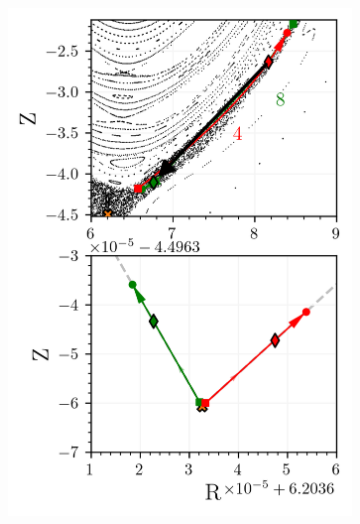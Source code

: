 \begin{figure}[h!]
    \centering
    \begin{subfigure}[c]{0.41\textwidth}
        \centering
        \includegraphics[width=\textwidth]{images/clinicsearch/clinic_start.png}
        \caption{}
        \label{fig:clinic-search-a}
    \end{subfigure}
    \hfill
    \begin{subfigure}[c]{0.58\textwidth}
        \centering

\end{subfigure}
\end{figure}
